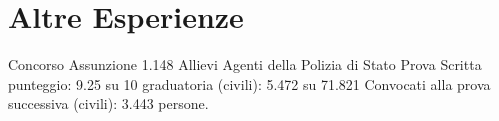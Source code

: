 %
%
%
%
%
%



\section{Altre Esperienze}

{Concorso Assunzione 1.148 Allievi Agenti della Polizia di Stato}
{Prova Scritta}
{punteggio: 9.25 su 10}
{graduatoria (civili): 5.472 su 71.821}
{Convocati alla prova successiva (civili): 3.443 persone.}
